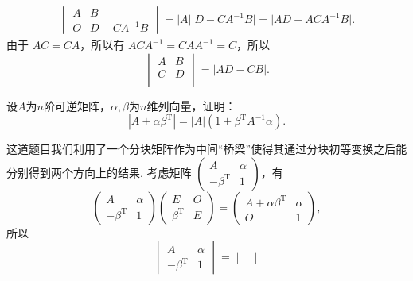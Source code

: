 \begin{exercise}
\begin{exgroup}
\begin{answer}
\begin{align*}
\begin{vmatrix}
                            A & B          \\
                            O & D-CA^{-1}B
                        \end{vmatrix}
                = \lvert A \rvert \lvert D-CA^{-1}B \rvert = \lvert AD-ACA^{-1}B \rvert.
            \end{align*} 由于 $AC = CA$，所以有 $ACA^{-1} = CAA^{-1} = C$，所以
            \[\begin{vmatrix}
                    A & B \\
                    C & D \\
                \end{vmatrix} = \lvert AD-CB \rvert.\]
        \end{answer}

        \item 设$A$为$n$阶可逆矩阵，$\alpha,\beta$为$n$维列向量，证明：
        \[|A+\alpha\beta^{\mathrm{T}}|=|A|(1+\beta^\mathrm{T}A^{-1}\alpha).\]
        \begin{answer}
            这道题目我们利用了一个分块矩阵作为中间``桥梁''使得其通过分块初等变换之后能分别得到两个方向上的结果. 考虑矩阵 $\begin{pmatrix}
                A                   & \alpha \\
                -\beta^{\mathrm{T}} & 1
            \end{pmatrix}$，有
            \[\begin{pmatrix}
                    A                   & \alpha \\
                    -\beta^{\mathrm{T}} & 1
                \end{pmatrix} \begin{pmatrix}
                    E                  & O \\
                    \beta^{\mathrm{T}} & E
                \end{pmatrix} = \begin{pmatrix}
                    A+\alpha \beta^{\mathrm{T}} & \alpha \\
                    O                           & 1
                \end{pmatrix},\]
            所以
            \[\begin{vmatrix}
                    A                   & \alpha \\
                    -\beta^{\mathrm{T}} & 1
                \end{vmatrix} = \begin{vmatrix}

\end{vmatrix}\]
\end{answer}
\end{exgroup}
\end{exercise}
